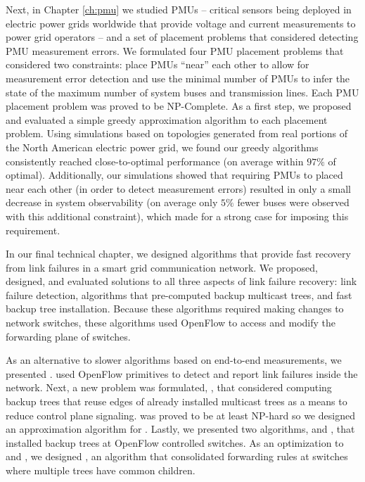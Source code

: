 Next, in Chapter \ref{ch:pmu} we studied PMUs -- critical sensors being deployed in electric power grids worldwide that provide voltage and current measurements to power grid operators -- and 
a set of placement problems that considered detecting PMU measurement errors.  We formulated four PMU placement problems that 
considered two constraints: place PMUs ``near'' each other to allow for measurement error detection and use the minimal number of PMUs to infer the state 
of the maximum number of system buses and transmission lines. Each PMU placement problem was proved to be NP-Complete. As a first step, we proposed and evaluated  
a simple greedy approximation algorithm to each placement problem.  Using simulations based on topologies generated from real portions of the North American electric power grid, we found 
our greedy algorithms consistently reached close-to-optimal performance (on average within $97\%$ of optimal).  
Additionally, our simulations showed that requiring PMUs to placed near each other (in order to detect measurement errors) resulted in only a small decrease in system observability (on average
only $5\%$ fewer buses were observed with this additional constraint), which made for a strong case for imposing this requirement.

In our final technical chapter, we designed algorithms that provide fast recovery from link failures in a smart grid communication network. 
We proposed, designed, and evaluated solutions to all three aspects of link failure recovery: link failure detection, algorithms that pre-computed backup multicast trees, and
fast backup tree installation.  Because these algorithms required making changes to network switches, these algorithms used OpenFlow to access and modify the forwarding plane of switches. 


As an alternative to slower algorithms based on end-to-end measurements, we presented \pcnts.  \pcnt used OpenFlow primitives to detect and report link failures inside the network.  
Next, a new problem was formulated, \mcs, that considered computing backup trees that reuse edges of already installed multicast trees as a means to reduce control plane signaling.
\mc was proved to be at least NP-hard so we designed an approximation algorithm for \mcs. Lastly, we presented two algorithms, \pre and \posts, that installed backup trees 
at OpenFlow controlled switches.  As an optimization to \pre and \posts, we designed \merges, an algorithm that consolidated forwarding rules at switches where multiple trees have common children.

